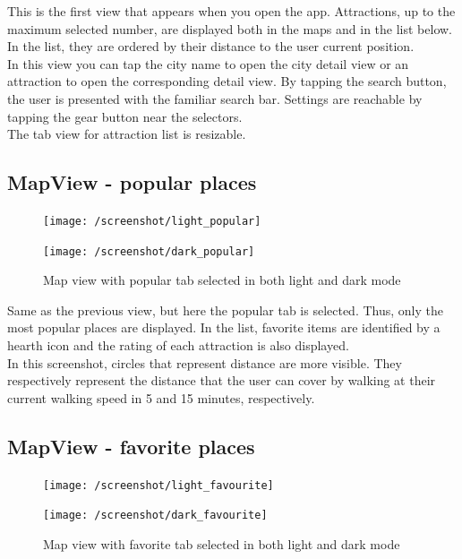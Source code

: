 \documentclass[a4paper, 11pt, parskip=half]{scrreprt}
\theoremstyle{definition}
\begin{document}
This is the first view that appears when you open the app. Attractions, up to the maximum selected number, are displayed both in the maps and in the list below. In the list, they are ordered by their distance to the user current position.
\\In this view you can tap the city name to open the city detail view or an attraction to open the corresponding detail view. By tapping the search button, the user is presented with the familiar search bar. Settings are reachable by tapping the gear button near the selectors.
\\The tab view for attraction list is resizable.

\subsection{MapView - popular places}

\begin{figure}[H]
	\centering
	\begin{minipage}{.5\textwidth}
  	\centering
  	\texttt{[image: /screenshot/light\_popular]}
  	\label{fig:test1}
	\end{minipage}%
	\begin{minipage}{.5\textwidth}
  	\centering
  	\texttt{[image: /screenshot/dark\_popular]}
  	\label{fig:test2}
	\end{minipage}
	\caption{Map view with popular tab selected in both light and dark mode}
\end{figure}

Same as the previous view, but here the popular tab is selected. Thus, only the most popular places are displayed. In the list, favorite items are identified by a hearth icon and the rating of each attraction is also displayed.
\\In this screenshot, circles that represent distance are more visible. They respectively represent the distance that the user can cover by walking at their current walking speed in 5 and 15 minutes, respectively.

\subsection{MapView - favorite places}

\begin{figure}[H]
	\centering
	\begin{minipage}{.5\textwidth}
  	\centering
  	\texttt{[image: /screenshot/light\_favourite]}
  	\label{fig:test1}
	\end{minipage}%
	\begin{minipage}{.5\textwidth}
  	\centering
  	\texttt{[image: /screenshot/dark\_favourite]}
  	\label{fig:test2}
	\end{minipage}
	\caption{Map view with favorite tab selected in both light and dark mode}
\end{figure}
\end{document}
